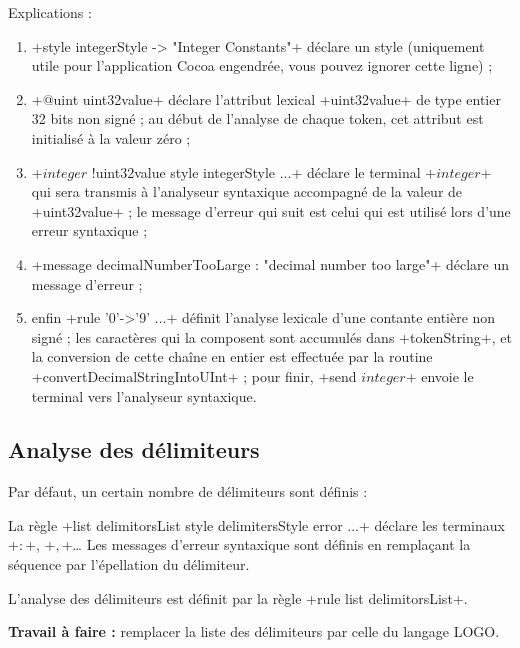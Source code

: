 Explications :
\begin{enumerate}
  \item \ggs+style integerStyle -> "Integer Constants"+ déclare un style (uniquement utile pour l’application Cocoa engendrée, vous pouvez ignorer cette ligne) ;
  \item \ggs+@uint uint32value+ déclare l’attribut lexical \ggs+uint32value+ de type entier 32 bits non signé ; au début de l’analyse de chaque token, cet attribut est initialisé à la valeur zéro ;
  \item \ggs+$integer$ !uint32value style integerStyle ...+ déclare le terminal \ggs+$integer$+ qui sera transmis à l’analyseur syntaxique accompagné de la valeur de \ggs+uint32value+ ;  le message d’erreur qui suit est celui qui est utilisé lors d’une erreur syntaxique ;
  \item \ggs+message decimalNumberTooLarge : "decimal number too large"+ déclare un message d’erreur ;
  \item enfin \ggs+rule '0'->'9' ...+ définit l’analyse lexicale d’une contante entière non signé ; les caractères qui la composent sont accumulés dans \ggs+tokenString+, et la conversion de cette chaîne en entier est effectuée par la routine \ggs+convertDecimalStringIntoUInt+ ; pour finir, \ggs+send $integer$+ envoie le terminal vers l’analyseur syntaxique.
\end{enumerate}

\subsection{Analyse des délimiteurs}
Par défaut, un certain nombre de délimiteurs sont définis :


La règle \ggs+list delimitorsList style delimitersStyle error ...+ déclare les terminaux \ggs+$:$+, \ggs+$,$+… Les messages d'erreur syntaxique sont définis en remplaçant la séquence  par l’épellation du délimiteur.

L'analyse des délimiteurs est définit par la règle \ggs+rule list delimitorsList+.

\textbf{Travail à faire :} remplacer la liste des délimiteurs par celle du langage LOGO.

